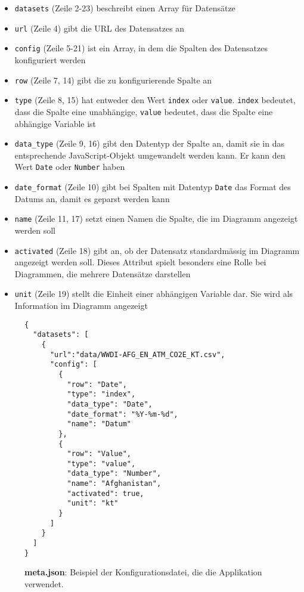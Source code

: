 \begin{itemize}
	\item \texttt{datasets} (Zeile 2-23) beschreibt einen Array für Datensätze
	\item \texttt{url} (Zeile 4) gibt die URL des Datensatzes an
	\item \texttt{config} (Zeile 5-21) ist ein Array, in dem die Spalten des Datensatzes konfiguriert werden
	\item \texttt{row} (Zeile 7, 14) gibt die zu konfigurierende Spalte an
	\item \texttt{type} (Zeile 8, 15) hat entweder den Wert \texttt{index} oder \texttt{value}. \texttt{index} bedeutet, dass die Spalte eine unabhängige, \texttt{value} bedeutet, dass die Spalte eine abhängige Variable ist
	\item \texttt{data\_type} (Zeile 9, 16) gibt den Datentyp der Spalte an, damit sie in das entsprechende JavaScript-Objekt umgewandelt werden kann. Er kann den Wert \texttt{Date} oder \texttt{Number} haben
	\item \texttt{date\_format} (Zeile 10) gibt bei Spalten mit Datentyp \texttt{Date} das Format des Datums an, damit es geparst werden kann
	\item \texttt{name} (Zeile 11, 17) setzt einen Namen die Spalte, die im Diagramm angezeigt werden soll
	\item \texttt{activated} (Zeile 18) gibt an, ob der Datensatz standardmässig im Diagramm angezeigt werden soll. Dieses Attribut spielt besonders eine Rolle bei Diagrammen, die mehrere Datensätze darstellen
	\item \texttt{unit} (Zeile 19) stellt die Einheit einer abhängigen Variable dar. Sie wird als Information im Diagramm angezeigt
\end{itemize}

\begin{figure}[!htbp]
	\centering
	\begin{verbatim}
{
  "datasets": [
    {
      "url":"data/WWDI-AFG_EN_ATM_CO2E_KT.csv",
      "config": [
        {
          "row": "Date",
          "type": "index",
          "data_type": "Date",
          "date_format": "%Y-%m-%d",
          "name": "Datum"
        },
        {
          "row": "Value",
          "type": "value",
          "data_type": "Number",
          "name": "Afghanistan",
          "activated": true,
          "unit": "kt"
        }
      ]
    }
  ]	
}
	\end{verbatim}
	
	
	\caption[Beispiel der Konfigurationsdatei: meta.json]{\textbf{meta.json}: Beispiel der Konfigurationsdatei, die die Applikation verwendet.}
	\label{fig:meta}
\end{figure}

